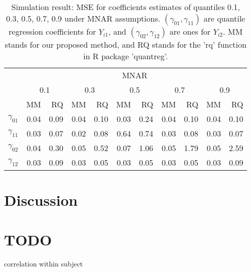 \documentclass[12pt]{article}
\begin{document}
\begin{table}[h]
  \renewcommand{\arraystretch}{1.3}
  \centering
  \caption{Simulation result: MSE for coefficients estimates of quantiles
    0.1, 0.3, 0.5, 0.7, 0.9 under MNAR assumptions. $(\gamma_{01}, \gamma_{11})$ 
    are quantile regression coefficients for $Y_{i1}$, and $(\gamma_{02}, \gamma_{12})$ 
    are ones for $Y_{i2}$. MM stands for our proposed method, and RQ stands for the 'rq' 
    function in R package 'quantreg'.}
  \vspace{10pt}
  \begin{tabular}{rrrrrrrrrrr}
    \hline
    & \multicolumn{ 10}{c}{MNAR} \\
    \cline{2-11}
    &  \multicolumn{2}{c}{0.1} &  \multicolumn{2}{c}{0.3} &  \multicolumn{2}{c}{0.5} &  \multicolumn{2}{c}{0.7} &  \multicolumn{2}{c}{0.9} \\
    \cline{2-11}
    & MM & RQ    & MM & RQ    & MM & RQ    & MM & RQ    & MM & RQ \\
    \hline
    $\gamma_{01}$ & 0.04 &0.09&0.04 &0.10 &0.03 &0.24 &0.04 &0.10 &0.04 &0.10 \\
    $\gamma_{11}$ & 0.03 &0.07&0.02 &0.08 &0.64 &0.74 &0.03 &0.08 &0.03 &0.07 \\ 
    $\gamma_{02}$ & 0.04 &0.30&0.05 &0.52 &0.07 &1.06 &0.05 &1.79 &0.05 &2.59 \\ 
    $\gamma_{12}$ & 0.03 &0.09&0.03 &0.05 &0.03 &0.05 &0.03 &0.05 &0.03 &0.09 \\ 
    \hline
  \end{tabular}  \label{tab:sim2}
\end{table}

\section{Discussion}
\label{sec:discussion}
\section{TODO}

correlation within subject

\appendix
\end{document}
